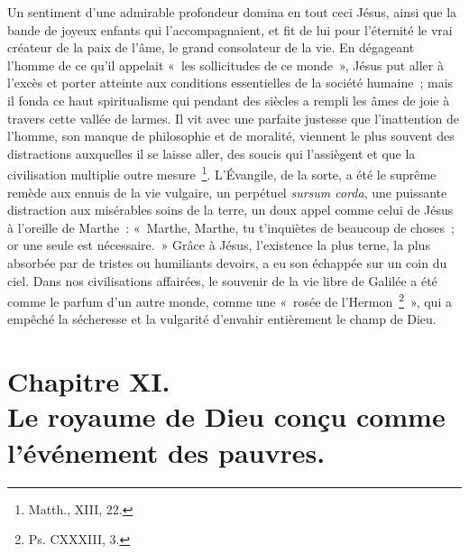 \documentclass[french,twoside]{book} %
\newcommand\chapteropen{} %
\newcommand\chapterclose{} %
\begin{document}
Un sentiment d’une admirable profondeur domina en tout ceci Jésus, ainsi que la bande de joyeux enfants qui l’accompagnaient, et fit de lui pour l’éternité le vrai créateur de la paix de l’âme, le grand consolateur de la vie. En dégageant l’homme de ce qu’il appelait « les sollicitudes de ce monde », Jésus put aller à l’excès et porter atteinte aux conditions essentielles de la société humaine ; mais il fonda ce haut spiritualisme qui pendant des siècles a rempli les âmes de joie à travers cette vallée de larmes. Il vit avec une parfaite justesse que l’inattention de l’homme, son manque de philosophie et de moralité, viennent le plus souvent des distractions auxquelles il se laisse aller, des soucis qui l’assiègent et que la civilisation multiplie outre mesure \footnote{Matth., XIII, 22.}. L’Évangile, de la sorte, a été le suprême remède aux ennuis de la vie vulgaire, un perpétuel {\itshape sursum corda}, une puissante distraction aux misérables soins de la terre, un doux appel comme celui de Jésus à l’oreille de Marthe : « Marthe, Marthe, tu t’inquiètes de beaucoup de choses ; or une seule est nécessaire. » Grâce à Jésus, l’existence la plus terne, la plus absorbée par de tristes ou humiliants devoirs, a eu son échappée sur un coin du ciel. Dans nos civilisations affairées, le souvenir de la vie libre de Galilée a été comme le parfum d’un autre monde, comme une « rosée de l’Hermon \footnote{Ps. CXXXIII, 3.} », qui a empêché la sécheresse et la vulgarité d’envahir entièrement le champ de Dieu.
\chapterclose


\chapteropen
\chapter[{Chapitre XI. Le royaume de Dieu conçu comme l’événement des pauvres.}]{Chapitre XI.\\
Le royaume de Dieu conçu comme l’événement des pauvres.}\renewcommand{\leftmark}{Chapitre XI.\\
Le royaume de Dieu conçu comme l’événement des pauvres.}
\end{document}
